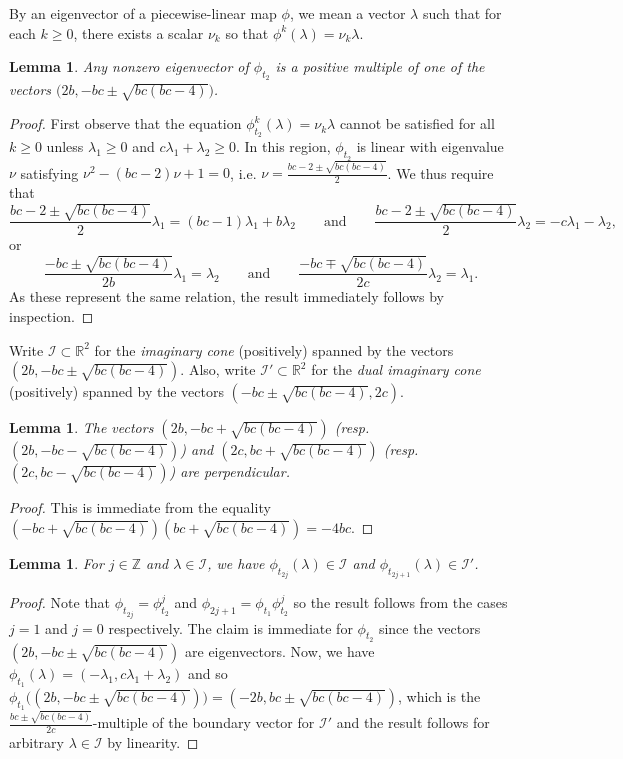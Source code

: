 \documentclass{amsart}
\newtheorem{lemma}[theorem]{Lemma}
\numberwithin{theorem}{section}
\newcommand{\cI}{\mathcal{I}}
\newcommand{\RR}{\mathbb{R}}
\newcommand{\ZZ}{\mathbb{Z}}
\begin{document}
  By an eigenvector of a piecewise-linear map $\phi$, we mean a vector $\lambda$ such that for each $k\ge0$, there exists a scalar $\nu_k$ so that $\phi^k(\lambda)=\nu_k\lambda$.
  \begin{lemma}
    Any nonzero eigenvector of $\phi_{t_2}$ is a positive multiple of one of the vectors $\big(2b,-bc\pm\sqrt{bc(bc-4)}\big)$.
  \end{lemma}
  \begin{proof}
    First observe that the equation $\phi_{t_2}^k(\lambda)=\nu_k\lambda$ cannot be satisfied for all $k\ge0$ unless $\lambda_1\ge 0$ and $c\lambda_1+\lambda_2\ge 0$.
    In this region, $\phi_{t_2}$ is linear with eigenvalue $\nu$ satisfying $\nu^2-(bc-2)\nu+1=0$, i.e. $\nu=\frac{bc-2\pm\sqrt{bc(bc-4)}}{2}$.
    We thus require that 
    \[\frac{bc-2\pm\sqrt{bc(bc-4)}}{2}\lambda_1=(bc-1)\lambda_1+b\lambda_2 \qquad\text{and}\qquad \frac{bc-2\pm\sqrt{bc(bc-4)}}{2}\lambda_2= -c\lambda_1-\lambda_2,\]
    or
    \[\frac{-bc\pm\sqrt{bc(bc-4)}}{2b}\lambda_1=\lambda_2 \qquad\text{and}\qquad \frac{-bc\mp\sqrt{bc(bc-4)}}{2c}\lambda_2=\lambda_1.\]
    As these represent the same relation, the result immediately follows by inspection.
  \end{proof}

  Write $\cI \subset \RR^2$ for the \emph{imaginary cone} (positively) spanned by the vectors $(2b,-bc\pm\sqrt{bc(bc-4)})$.
  Also, write $\cI' \subset \RR^2$ for the \emph{dual imaginary cone} (positively) spanned by the vectors $(-bc\pm\sqrt{bc(bc-4)},2c)$.
  \begin{lemma}
    The vectors $(2b, -bc+\sqrt{bc(bc-4)})$ (resp. $(2b, -bc-\sqrt{bc(bc-4)})$) and $(2c, bc+\sqrt{bc(bc-4)})$ (resp. $(2c, bc-\sqrt{bc(bc-4)})$) are perpendicular.
  \end{lemma}
  \begin{proof}
    This is immediate from the equality $(-bc+\sqrt{bc(bc-4)})(bc+\sqrt{bc(bc-4)})=-4bc$.
  \end{proof}
  \begin{lemma}
    \label{le:imaginary stability}
    For $j\in\ZZ$ and $\lambda\in\cI$, we have $\phi_{t_{2j}}(\lambda)\in\cI$ and $\phi_{t_{2j+1}}(\lambda)\in\cI'$.
  \end{lemma}
  \begin{proof}
    Note that $\phi_{t_{2j}}=\phi_{t_2}^j$ and $\phi_{2j+1}=\phi_{t_1}\phi_{t_2}^j$ so the result follows from the cases $j=1$ and $j=0$ respectively.
    The claim is immediate for $\phi_{t_2}$ since the vectors $(2b,-bc\pm\sqrt{bc(bc-4)})$ are eigenvectors.
    Now, we have $\phi_{t_1}(\lambda)=(-\lambda_1,c\lambda_1+\lambda_2)$ and so $\phi_{t_1}\big( (2b,-bc\pm\sqrt{bc(bc-4)}) \big)=(-2b,bc\pm\sqrt{bc(bc-4)})$, which is the $\frac{bc\pm\sqrt{bc(bc-4)}}{2c}$-multiple of the boundary vector for $\cI'$ and the result follows for arbitrary $\lambda\in\cI$ by linearity.
  \end{proof}
\end{document}
